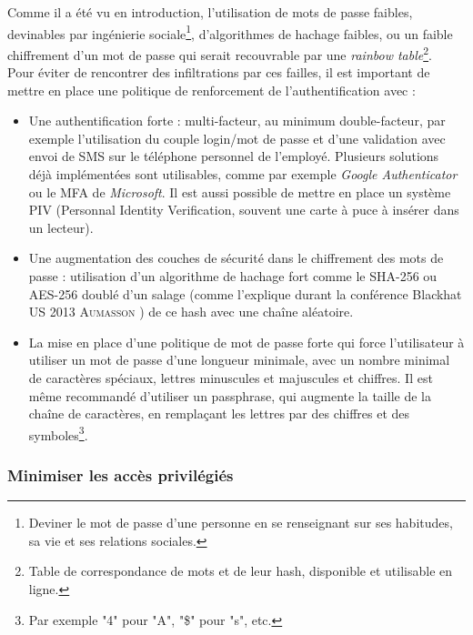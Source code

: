 Comme il a été vu en introduction, l'utilisation de mots de passe faibles, devinables par ingénierie sociale\footnote{Deviner le mot de passe d'une personne en se renseignant sur ses habitudes, sa vie et ses relations sociales.}, d'algorithmes de hachage faibles, ou un faible chiffrement d'un mot de passe qui serait recouvrable par une \emph{rainbow table}\footnote{Table de correspondance de mots et de leur hash, disponible et utilisable en ligne.}.\\
Pour éviter de rencontrer des infiltrations par ces failles, il est important de mettre en place une politique de renforcement de l'authentification avec :
\begin{itemize}
	\item Une authentification forte : multi-facteur, au minimum double-facteur, par exemple l'utilisation du couple login/mot de passe et d'une validation avec envoi de SMS sur le téléphone personnel de l'employé. Plusieurs solutions déjà implémentées sont utilisables, comme par exemple \emph{Google Authenticator} ou le MFA de \emph{Microsoft}. Il est aussi possible de mettre en place un système PIV (Personnal Identity Verification, souvent une carte à puce à insérer dans un lecteur).
	\item Une augmentation des couches de sécurité dans le chiffrement des mots de passe : utilisation d'un algorithme de hachage fort comme le SHA-256 ou AES-256 doublé d'un salage (comme l'explique durant la conférence Blackhat US 2013 \textsc{Aumasson} \cite{jpa}) de ce hash avec une chaîne aléatoire.
	\item La mise en place d'une politique de mot de passe forte qui force l'utilisateur à utiliser un mot de passe d'une longueur minimale, avec un nombre minimal de caractères spéciaux, lettres minuscules et majuscules et chiffres. Il est même recommandé d'utiliser un passphrase, qui augmente la taille de la chaîne de caractères, en remplaçant les lettres par des chiffres et des symboles\footnote{Par exemple "4" pour "A", "\$" pour "s", etc.}.
\end{itemize}

\subsubsection{Minimiser les accès privilégiés}
\label{par:minipriv}

